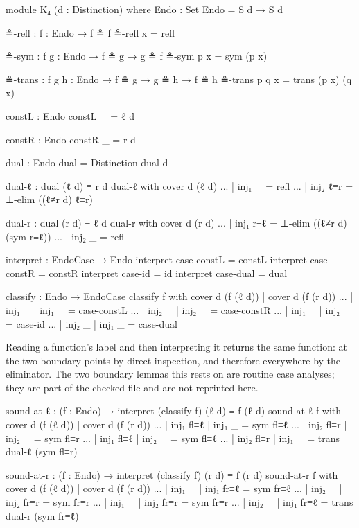 \documentclass[11pt,a4paper]{book}
\begin{document}
\begin{code}
module K₄ (d : Distinction) where
  Endo : Set
  Endo = S d → S d

  ≗-refl : {f : Endo} → f ≗ f
  ≗-refl x = refl

  ≗-sym : {f g : Endo} → f ≗ g → g ≗ f
  ≗-sym p x = sym (p x)

  ≗-trans : {f g h : Endo} → f ≗ g → g ≗ h → f ≗ h
  ≗-trans p q x = trans (p x) (q x)

  constL : Endo
  constL _ = ℓ d

  constR : Endo
  constR _ = r d

  dual : Endo
  dual = Distinction-dual d

  dual-ℓ : dual (ℓ d) ≡ r d
  dual-ℓ with cover d (ℓ d)
  ... | inj₁ _   = refl
  ... | inj₂ ℓ≡r = ⊥-elim ((ℓ≠r d) ℓ≡r)

  dual-r : dual (r d) ≡ ℓ d
  dual-r with cover d (r d)
  ... | inj₁ r≡ℓ = ⊥-elim ((ℓ≠r d) (sym r≡ℓ))
  ... | inj₂ _   = refl

  interpret : EndoCase → Endo
  interpret case-constL = constL
  interpret case-constR = constR
  interpret case-id     = id
  interpret case-dual   = dual

  classify : Endo → EndoCase
  classify f with cover d (f (ℓ d)) | cover d (f (r d))
  ... | inj₁ _ | inj₁ _ = case-constL
  ... | inj₂ _ | inj₂ _ = case-constR
  ... | inj₁ _ | inj₂ _ = case-id
  ... | inj₂ _ | inj₁ _ = case-dual
\end{code}

Reading a function's label and then interpreting it returns the same
function: at the two boundary points by direct inspection, and therefore
everywhere by the eliminator. The two boundary lemmas this rests on are
routine case analyses; they are part of the checked file and are not
reprinted here.

\begin{code}[hide]
  sound-at-ℓ : (f : Endo) → interpret (classify f) (ℓ d) ≡ f (ℓ d)
  sound-at-ℓ f with cover d (f (ℓ d)) | cover d (f (r d))
  ... | inj₁ fl≡ℓ | inj₁ _     = sym fl≡ℓ
  ... | inj₂ fl≡r | inj₂ _     = sym fl≡r
  ... | inj₁ fl≡ℓ | inj₂ _     = sym fl≡ℓ
  ... | inj₂ fl≡r | inj₁ _     = trans dual-ℓ (sym fl≡r)

  sound-at-r : (f : Endo) → interpret (classify f) (r d) ≡ f (r d)
  sound-at-r f with cover d (f (ℓ d)) | cover d (f (r d))
  ... | inj₁ _     | inj₁ fr≡ℓ = sym fr≡ℓ
  ... | inj₂ _     | inj₂ fr≡r = sym fr≡r
  ... | inj₁ _     | inj₂ fr≡r = sym fr≡r
  ... | inj₂ _     | inj₁ fr≡ℓ = trans dual-r (sym fr≡ℓ)
\end{code}
\end{document}
